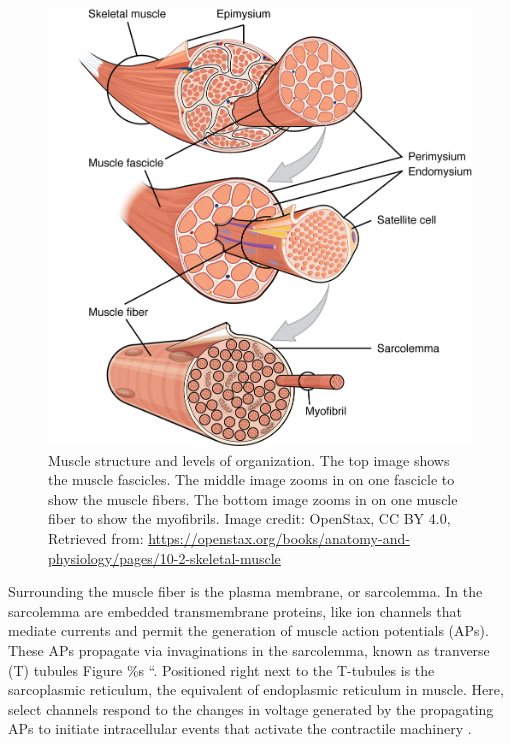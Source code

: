 \documentclass{article}
\begin{document}
\begin{figure}[!htbp]
\centering
\includegraphics[width=0.8\linewidth]{files/EPpXta8zJdzN048lz8AR-d7479b1cd7e2cf8364af6a3fea9c857f.jpeg}
\caption[]{Muscle structure and levels of organization. The top image shows the muscle fascicles. The middle image zooms in on one fascicle to show the muscle fibers. The bottom image zooms in on one muscle fiber to show the myofibrils. Image credit: OpenStax, CC BY 4.0, Retrieved from: \href{https://openstax.org/books/anatomy-and-physiology/pages/10-2-skeletal-muscle}{https://openstax.org/books/anatomy-and-physiology/pages/10-2-skeletal-muscle}}
\label{IRsmgFXl0q}
\end{figure}

Surrounding the muscle fiber is the plasma membrane, or sarcolemma. In the sarcolemma are embedded transmembrane proteins, like ion channels that mediate currents and permit the generation of muscle action potentials (APs). These APs propagate via invaginations in the sarcolemma, known as tranverse (T) tubules \citep{}Figure \%s ``. Positioned right next to the T-tubules is the sarcoplasmic reticulum, the equivalent of endoplasmic reticulum in muscle. Here, select channels respond to the changes in voltage generated by the propagating APs to initiate intracellular events that activate the contractile machinery \citep{guyton2016book, openStax_muscle}.
\end{document}
